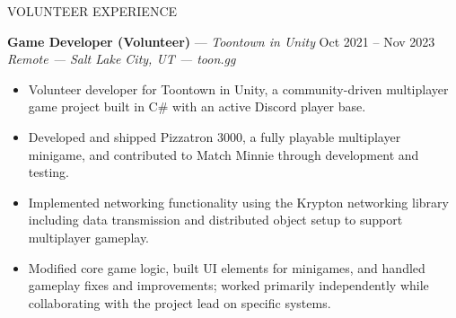 \documentclass{resume}
\begin{document}

\begin{rSection}{VOLUNTEER EXPERIENCE}

\textbf{Game Developer (Volunteer)} --- \textit{Toontown in Unity} \hfill Oct 2021 -- Nov 2023 \\
\textit{Remote --- Salt Lake City, UT --- toon.gg}
\begin{itemize}
    \item Volunteer developer for Toontown in Unity, a community-driven multiplayer game project built in C\# with an active Discord player base.
    \item Developed and shipped Pizzatron 3000, a fully playable multiplayer minigame, and contributed to Match Minnie through development and testing.
    \item Implemented networking functionality using the Krypton networking library including data transmission and distributed object setup to support multiplayer gameplay.
    \item Modified core game logic, built UI elements for minigames, and handled gameplay fixes and improvements; worked primarily independently while collaborating with the project lead on specific systems.
\end{itemize}

\end{rSection}

\end{document}
